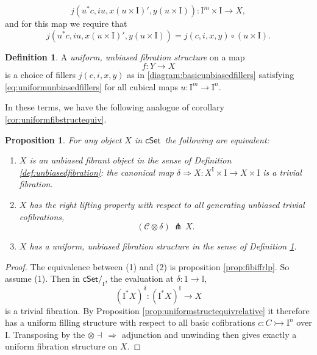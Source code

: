 \documentclass[11pt,reqno]{amsart}
\newcommand{\cSet}{\ensuremath{\mathsf{cSet}}}
\newcommand{\slice}[1]{\ensuremath{/_{\!{#1}}}}
\newcommand{\mono}{\ensuremath{\rightarrowtail}}
\newcommand{\ra}{\ensuremath{\rightarrow}}
\renewcommand{\to}{\ensuremath{\rightarrow}}
\newcommand{\too}{\ensuremath{\longrightarrow}}
\newcommand{\I}{\ensuremath{\mathrm{I}}}
\newcommand{\II}{\ensuremath{\mathbb{I}}}
\newtheorem{proposition}[theorem]{Proposition}
\theoremstyle{remark}
\theoremstyle{definition}
\newtheorem{definition}[theorem]{Definition}
\begin{document}
\[
j(u^*c,iu,x(u\times \I)', y(u\times \I)): \I^m\times\I\ra X,
\]
 and for this map we require that
\begin{equation}\label{eq:uniformunbiasedfillers}
j(u^*c,iu,x(u\times \I)', y(u\times \I)) = j(c,i,x,y)\circ (u\times \I).
\end{equation}

\begin{definition}\label{def:unbiasedfibstructure} A \emph{uniform, unbiased fibration structure} on a map 
\[
f: Y\ra X
\]
 is a choice of fillers $j(c,i,x,y)$ as in \eqref{diagram:basicunbiasedfillers} satisfying \eqref{eq:uniformunbiasedfillers} for all cubical maps $u : \I^m\to\I^n$.
\end{definition}

In these terms, we have the following analogue of corollary \ref{cor:uniformfibstructequiv}.

\begin{proposition}\label{prop:equivfibstruc} For any object $X$ in \cSet\ the following are equivalent:
\begin{enumerate}
\item $X$ is an unbiased fibrant object in the sense of Definition \ref{def:unbiasedfibration}: the canonical map $\delta\Rightarrow X : X^\I\times \I \ra X\times \I$ is a trivial fibration. 

\item $X$ has the right lifting property with respect to all generating unbiased trivial cofibrations,
\[
(\mathcal{C}\otimes\delta)\, \pitchfork\,X.
\]

\item $X$ has a uniform, unbiased fibration structure in the sense of Definition \ref{def:unbiasedfibstructure}.
\end{enumerate}
\end{proposition}

\begin{proof}
The equivalence between (1) and (2) is proposition \ref{prop:fibiffrlp}.  
So assume (1).
Then in $\cSet\slice{\I}$, the evaluation at $\delta : 1\to\II$,
\[
(\I^*X)^\delta : (\I^*X)^\II \too X
\]
is a trivial fibration.  By Proposition \ref{prop:uniformstructequivrelative} it therefore 
has a uniform filling structure with respect to all basic cofibrations $c :C\mono \I^n$ over $\I$.  Transposing by the $\otimes\dashv\,\Rightarrow$ adjunction and unwinding then gives exactly a uniform fibration structure on $X$.
\end{proof}
\end{document}
